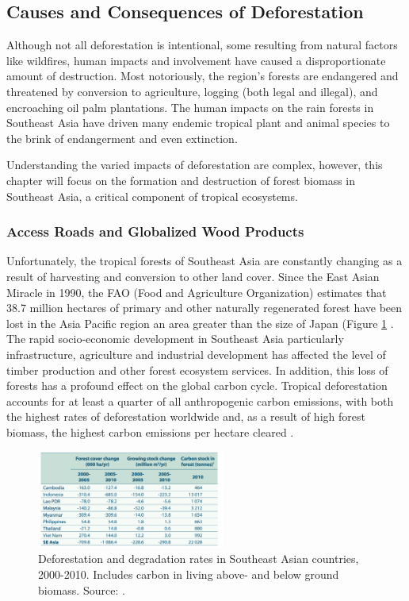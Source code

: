 \subsection{Causes and Consequences of Deforestation}

Although not all deforestation is intentional, some resulting from natural factors like wildfires, human impacts and involvement have caused a disproportionate amount of destruction. Most notoriously, the region's forests are endangered and threatened by conversion to agriculture, logging (both legal and illegal), and encroaching oil palm plantations. The human impacts on the rain forests in Southeast Asia have driven many endemic tropical plant and animal species to the brink of endangerment and even extinction. 
 
Understanding the varied impacts of deforestation are complex, however, this chapter will focus on the formation and destruction of forest biomass in Southeast Asia, a critical component of tropical ecosystems. 

\subsubsection{Access Roads and Globalized Wood Products}

Unfortunately, the tropical forests of Southeast Asia are constantly changing as a result of harvesting and conversion to other land cover. Since the East Asian Miracle in 1990, the FAO (Food and Agriculture Organization) estimates that 38.7 million hectares of primary and other naturally regenerated forest have been lost in the Asia Pacific region an area greater than the size of Japan (Figure \ref{fig:deforestation} \citep{faoun163agriculture}. The rapid socio-economic development in Southeast Asia particularly infrastructure, agriculture and industrial development has affected the level of timber production and other forest ecosystem services. In addition, this loss of forests has a profound effect on the global carbon cycle. Tropical deforestation accounts for at least a quarter of all anthropogenic carbon emissions, with both the highest rates of deforestation worldwide and, as a result of high forest biomass, the highest carbon emissions per hectare cleared \citep{corlett2014ecology}.

    \begin{figure}[ht]
    \centering
        \includegraphics[width = 0.55\textwidth]{graphics/carbonstock.png}
        \caption{Deforestation and degradation rates in Southeast Asian countries, 2000-2010. Includes carbon in living above- and below ground biomass. Source: \citep{faoun163agriculture}.}
				\label{fig:deforestation}
    \end{figure}

